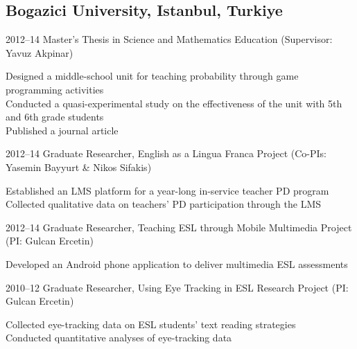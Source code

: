 \documentclass[11pt,letterpaper]{report} %
\newcommand{\indentedsmall}[1]{\hspace{2pt}\small{#1}\normalsize}
\begin{document}
    \subsection*{Bogazici University, Istanbul, Turkiye}

    \begin{tablist}

        \item[2012--14] \tab{}Master's Thesis in Science and Mathematics Education (Supervisor: Yavuz Akpinar) \\

        \vspace{4pt}

        \indentedsmall{Designed a middle-school unit for teaching probability through game programming activities} \\
        \indentedsmall{Conducted a quasi-experimental study on the effectiveness of the unit with 5th and 6th grade students} \\
        \indentedsmall{Published a journal article}

        \vspace{6pt}

        \item[2012--14] \tab{}Graduate Researcher, English as a Lingua Franca Project (Co-PIs: Yasemin Bayyurt \& Nikos Sifakis) \\

        \vspace{4pt}

        \indentedsmall{Established an LMS platform for a year-long in-service teacher PD program} \\
        \indentedsmall{Collected qualitative data on teachers' PD participation through the LMS}

        \vspace{6pt}

        \item[2012--14] \tab{}Graduate Researcher, Teaching ESL through Mobile Multimedia Project (PI: Gulcan Ercetin) \\

        \vspace{4pt}

        \indentedsmall{Developed an Android phone application to deliver multimedia ESL assessments} \\

        \vspace{6pt}

        \item[2010--12] \tab{}Graduate Researcher, Using Eye Tracking in ESL Research Project (PI: Gulcan Ercetin) \\

        \vspace{4pt}

        \indentedsmall{Collected eye-tracking data on ESL students' text reading strategies} \\
        \indentedsmall{Conducted quantitative analyses of eye-tracking data} \\

    \end{tablist}
\end{document}

